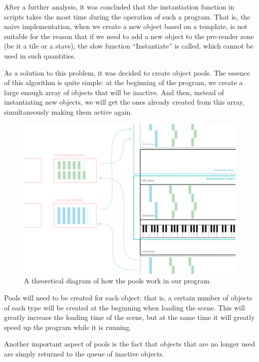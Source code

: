\documentclass[thesis=B,english]{FITthesis}[2019/12/23]
\begin{document}
After a further analysis, it was concluded that the instantiation function in scripts takes the most time during the operation of such a program. That is, the naive implementation, when we create a new object based on a template, is not suitable for the reason that if we need to add a new object to the pre-render zone (be it a tile or a stave), the slow function “Instantiate” is called. which cannot be used in such quantities.

As a solution to this problem, it was decided to create object pools. The essence of this algorithm is quite simple: at the beginning of the program, we create a large enough array of objects that will be inactive. And then, instead of instantiating new objects, we will get the ones already created from this array, simultaneously making them active again.

\begin{figure}[ht]
            \includegraphics[width=\textwidth]{Scheme2.png}
            \caption[Pools of objects in the program]{A theoretical diagram of how the pools work in our program.}
            \label{fig:Scheme2}
\end{figure}

Pools will need to be created for each object: that is, a certain number of objects of each type will be created at the beginning when loading the scene. This will greatly increase the loading time of the scene, but at the same time it will greatly speed up the program while it is running.

Another important aspect of pools is the fact that objects that are no longer used are simply returned to the queue of inactive objects.
\end{document}
